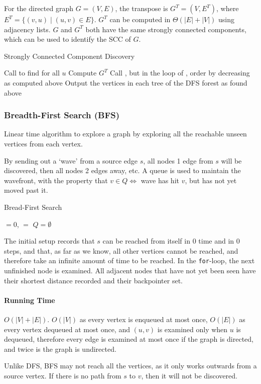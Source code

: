 \documentclass[10pt]{article}
\begin{document}
For the directed graph $G=(V,E)$, the transpose is $G^T=(V,E^T)$, where $E^T=\{(v,u)\mid(u,v)\in E\}$.  $G^T$ can be computed in $\Theta(|E|+|V|)$ using adjacency lists.  $G$ and $G^T$ both have the same strongly connected components, which can be used to identify the SCC of $G$.
\begin{algorithm}
	\caption{Strongly Connected Component Discovery}
	Call  to find  for all $u$\;
	Compute $G^T$\;
	Call , but in the loop of \DFS, order by decreasing  as computed above\;
	Output the vertices in each tree of the DFS forest as found above\;
\end{algorithm}
\subsubsection{Breadth-First Search (BFS)}
Linear time algorithm to explore a graph by exploring all the reachable unseen vertices from each vertex.

By sending out a `wave' from a source edge $s$, all nodes 1 edge from $s$ will be discovered, then all nodes 2 edges away, etc.  A queue is used to maintain the wavefront, with the property that $v\in Q\Leftrightarrow$ wave has hit $v$, but has not yet moved past it.
\begin{algorithm}
	\caption{Bread-First Search}
	
	$=0$, $=$\null\;
	$Q=\emptyset$\;
	\;
\end{algorithm}
The initial setup records that $s$ can be reached from itself in 0 time and in 0 steps, and that, as far as we know, all other vertices cannot be reached, and therefore take an infinite amount of time to be reached.  In the \texttt{for}-loop, the next unfinished node is examined.  All adjacent nodes that have not yet been seen have their shortest distance recorded and their backpointer set.
\paragraph{Running Time}$O(|V|+|E|)$.  $O(|V|)$ as every vertex is enqueued at most once, $O(|E|)$ as every vertex dequeued at most once, and $(u,v)$ is examined only when $u$ is dequeued, therefore every edge is examined at most once if the graph is directed, and twice is the graph is undirected.

Unlike DFS, BFS may not reach all the vertices, as it only works outwards from a source vertex.  If there is no path from $s$ to $v$, then it will not be discovered.
\end{document}
